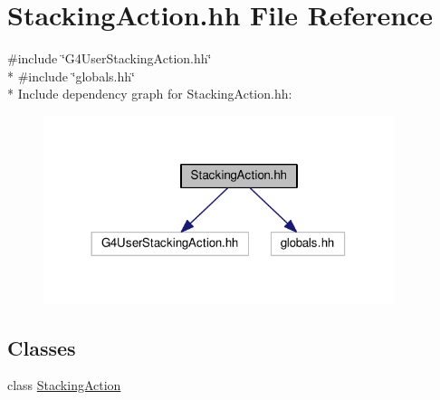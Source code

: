 \hypertarget{StackingAction_8hh}{}\section{Stacking\+Action.\+hh File Reference}
\label{StackingAction_8hh}
{\ttfamily \#include \char`\"{}G4\+User\+Stacking\+Action.\+hh\char`\"{}}\\*
{\ttfamily \#include \char`\"{}globals.\+hh\char`\"{}}\\*
Include dependency graph for Stacking\+Action.\+hh\+:
\nopagebreak
\begin{figure}[H]
\begin{center}
\leavevmode
\includegraphics[width=290pt]{StackingAction_8hh__incl}
\end{center}
\end{figure}
\subsection*{Classes}
\begin{DoxyCompactItemize}
\item 
class \hyperlink{classStackingAction}{Stacking\+Action}
\end{DoxyCompactItemize}
